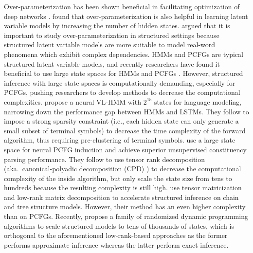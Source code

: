 \documentclass[11pt]{article}
\begin{document}
Over-parameterization has been shown beneficial in facilitating optimization of deep networks \cite{DBLP:conf/icml/AroraCH18, DBLP:conf/nips/XuHM18, DBLP:conf/iclr/DuZPS19}. \citet{DBLP:conf/icml/BuhaiHKRS20} found that over-parameterization is also helpful in learning latent variable models by increasing the number of hidden states. \citet{DBLP:conf/icml/BuhaiHKRS20} argued that it is important to study over-parameterization in structured settings because structured latent variable models are more suitable to model real-word phenomena which exhibit complex dependencies. HMMs and PCFGs are typical structured latent variable models, and recently researchers have found it beneficial to use large state spaces for HMMs and PCFGs \cite{DBLP:journals/corr/abs-1905-00507, chiu-rush-2020-scaling, yang-etal-2021-pcfgs, chiu2021low}.
However, structured inference with large state spaces is computationally demanding, especially for PCFGs, pushing researchers to develop methods to decrease the computational complexities. 
\citet{chiu-rush-2020-scaling} propose a neural VL-HMM with $2^{15}$ states for language modeling, narrowing down the performance gap between HMMs and LSTMs. 
  They follow \citet{DBLP:journals/corr/abs-1905-00507} to impose a strong sparsity constraint (i.e., each hidden state can only generate a small subset of terminal symbols) to decrease the time complexity of the forward algorithm, thus requiring pre-clustering of terminal symbols.
\citet{yang-etal-2021-pcfgs} use a large state space for neural PCFG induction and achieve superior unsupervised constituency parsing performance. They follow \citet{cohen-etal-2013-approximate} to use tensor rank decomposition (aka.\ canonical-polyadic decomposition (CPD) \cite{DBLP:journals/corr/abs-1711-10781}) to decrease the computational complexity of the inside algorithm, but only scale the state size from tens to hundreds because the resulting complexity is still high. \citet{chiu2021low} use tensor matricization and low-rank matrix decomposition to accelerate structured inference on chain and tree structure models. However, their method has an even higher complexity than \citet{yang-etal-2021-pcfgs} on PCFGs. Recently, \citet{fu2021scaling} propose a family of randomized dynamic programming algorithms to scale structured models to tens of thousands of states, which is orthogonal to the aforementioned low-rank-based approaches as the former performs approximate inference whereas the latter perform exact inference. 
\end{document}
